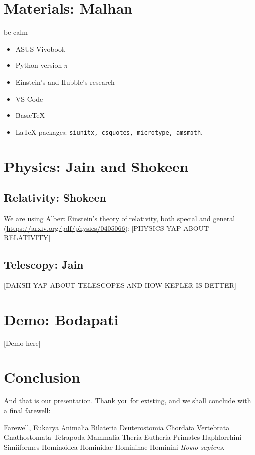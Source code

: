 \documentclass{article}
\begin{document}
\section{Materials: Malhan}
be calm
\begin{itemize}
    \item ASUS Vivobook
    \item Python version \(\pi\)
    \item Einstein's and Hubble's research
    \item VS Code
    \item Basic\TeX
    \item \LaTeX{} packages: \verb|siunitx, csquotes, microtype, amsmath|.
\end{itemize}

\section{Physics: Jain and Shokeen}
\subsection{Relativity: Shokeen}
We are using Albert Einstein's theory of relativity, both special and general (\url{https://arxiv.org/pdf/physics/0405066}):
[PHYSICS YAP ABOUT RELATIVITY]
\subsection{Telescopy: Jain}
[DAKSH YAP ABOUT TELESCOPES AND HOW KEPLER IS BETTER]
\section{Demo: Bodapati}
[Demo here]
\section{Conclusion}
And that is our presentation. Thank you for existing, and we shall conclude with a final farewell:

Farewell, Eukarya Animalia Bilateria Deuterostomia Chordata Vertebrata Gnathostomata Tetrapoda Mammalia Theria Eutheria Primates Haphlorrhini Simiiformes Hominoidea Hominidae Homininae Hominini \textit{Homo sapiens}.
\end{document}
